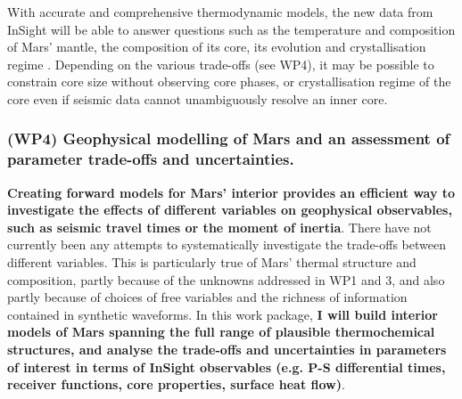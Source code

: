 \documentclass[11pt,twoside,a4paper]{article}
\begin{document}
With accurate and comprehensive thermodynamic models, the new data from InSight will be able to answer questions such as the temperature and composition of Mars' mantle, the composition of its core, its evolution and crystallisation regime \citep{SSWL2007}. Depending on the various trade-offs (see WP4), it may be possible to constrain core size without observing core phases, or crystallisation regime of the core even if seismic data cannot unambiguously resolve an inner core. 





\subsubsection*{(WP4) Geophysical modelling of Mars and an assessment of parameter trade-offs and uncertainties.}

\textbf{Creating forward models for Mars' interior provides an efficient way to investigate the effects of different variables on geophysical observables, such as seismic travel times or the moment of inertia}. There have not currently been any attempts to systematically investigate the trade-offs between different variables. This is particularly true of Mars' thermal structure and composition, partly because of the unknowns addressed in WP1 and 3, and also partly because of choices of free variables and the richness of information contained in synthetic waveforms. In this work package, \textbf{I will build interior models of Mars spanning the full range of plausible thermochemical structures, and analyse the trade-offs and uncertainties in parameters of interest in terms of InSight observables (e.g. P-S differential times, receiver functions, core properties, surface heat flow)}.
\end{document}
